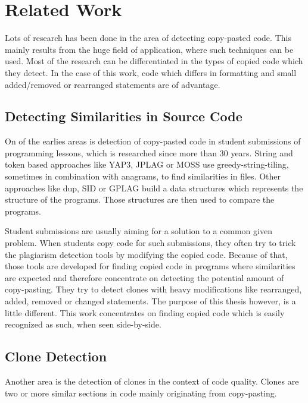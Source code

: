 
\chapter{Related Work}\label{chapter:related_work}
Lots of research has been done in the area of detecting copy-pasted code.
This mainly results from the huge field of application, where such techniques can be used.
Most of the research can be differentiated in the types of copied code which they detect.
In the case of this work, code which differs in formatting and small added/removed or rearranged statements are of advantage. %

\section{Detecting Similarities in Source Code}\label{section:related_work/detecting_similarities}
On of the earlies areas is detection of copy-pasted code in student submissions of programming lessons, which is researched since more than 30 years\cite{lancaster2004comparison}.
String and token based approaches like YAP3\cite{wise1996yap3}, JPLAG\cite{prechelt2002finding} or MOSS\cite{schleimer2003winnowing} use greedy-string-tiling, sometimes in combination with anagrams, to find similarities in files.
Other approaches like dup\cite{baker1995finding}, SID\cite{chen2004shared} or GPLAG\cite{liu2006gplag} build a data structures which represents the structure of the programs.
Those structures are then used to compare the programs.

Student submissions are usually aiming for a solution to a common given problem.
When students copy code for such submissions, they often try to trick the plagiarism detection tools by modifying the copied code.
Because of that, those tools are developed for finding copied code in programs where similarities are expected and therefore concentrate on detecting the potential amount of copy-pasting.
They try to detect clones with heavy modifications like rearranged, added, removed or changed statements.
The purpose of this thesis however, is a little different.
This work concentrates on finding copied code which is easily recognized as such, when seen side-by-side.

\section{Clone Detection}\label{section:related_work/clone_detection}
Another area is the detection of clones in the context of code quality.
Clones are two or more similar sections in code mainly originating from copy-pasting.

